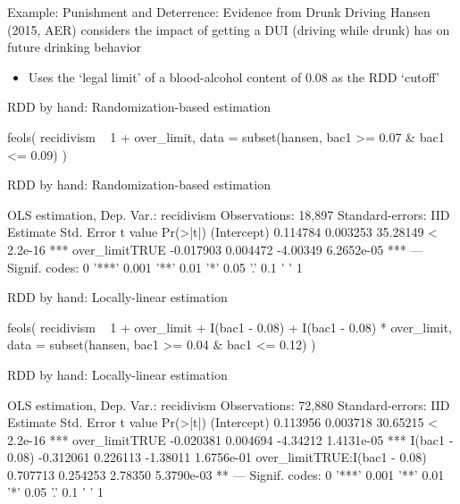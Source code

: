 \documentclass[aspectratio=169,t,11pt,table]{beamer}
\begin{document}
\begin{frame}{Example: Punishment and Deterrence: Evidence from Drunk Driving}
  Hansen (2015, AER) considers the impact of getting a DUI (driving while drunk) has on future drinking behavior
  \begin{itemize}
    \item Uses the `legal limit' of a blood-alcohol content of 0.08 as the RDD `cutoff'
  \end{itemize}
\end{frame}


\begin{frame}[fragile]{RDD by hand: Randomization-based estimation}
	\begin{codeblock}
feols(
  recidivism ~ 1 + over_limit,
  data = subset(hansen, bac1 >= 0.07 & bac1 <= 0.09)
)
	\end{codeblock}
\end{frame}

\begin{frame}[fragile]{RDD by hand: Randomization-based estimation}
  \begin{codeblock}[{}]
OLS estimation, Dep. Var.: recidivism
Observations: 18,897
Standard-errors: IID 
                Estimate Std. Error  t value   Pr(>|t|)    
(Intercept)     0.114784   0.003253 35.28149  < 2.2e-16 ***
over_limitTRUE -0.017903   0.004472 -4.00349 6.2652e-05 ***
---
Signif. codes:  0 '***' 0.001 '**' 0.01 '*' 0.05 '.' 0.1 ' ' 1
  \end{codeblock}
\end{frame}

\begin{frame}[fragile]{RDD by hand: Locally-linear estimation}
  \vspace{-\bigskipamount}
	\begin{codeblock}
feols(
  recidivism ~ 1 + over_limit + 
    I(bac1 - 0.08) + I(bac1 - 0.08) * over_limit,
  data = subset(hansen, bac1 >= 0.04 & bac1 <= 0.12)
)
	\end{codeblock}
\end{frame}

\begin{frame}[fragile]{RDD by hand: Locally-linear estimation}
  \begin{codeblock}[{}]
OLS estimation, Dep. Var.: recidivism
Observations: 72,880
Standard-errors: IID 
                                Estimate Std. Error  t value   Pr(>|t|)    
(Intercept)                    0.113956   0.003718 30.65215  < 2.2e-16 ***
over_limitTRUE                -0.020381   0.004694 -4.34212 1.4131e-05 ***
I(bac1 - 0.08)                -0.312061   0.226113 -1.38011 1.6756e-01    
over_limitTRUE:I(bac1 - 0.08)  0.707713   0.254253  2.78350 5.3790e-03 ** 
---
Signif. codes:  0 '***' 0.001 '**' 0.01 '*' 0.05 '.' 0.1 ' ' 1
  \end{codeblock}
\end{frame}
\end{document}
